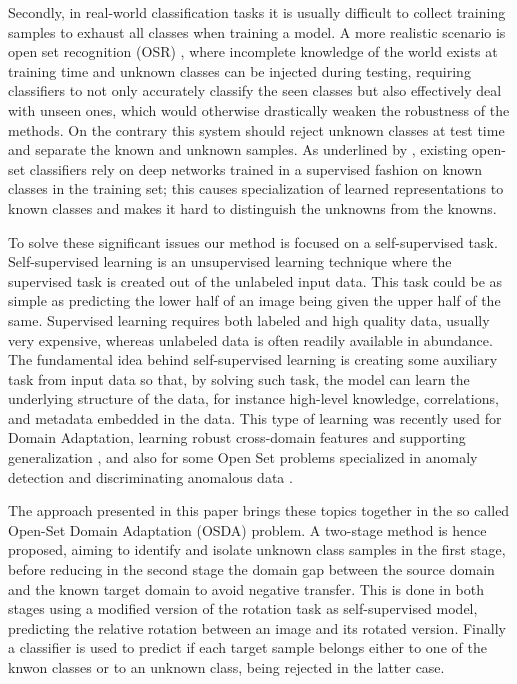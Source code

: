 \documentclass[10pt,twocolumn,letterpaper]{article}
\begin{document}
Secondly, 
in real-world classification tasks it is usually difficult to collect training samples to exhaust all classes when training a model.
A more realistic scenario is open set recognition (OSR) \cite{OSRsurvey},
where incomplete knowledge of the world exists at training time and unknown classes can be injected during testing, 
requiring classifiers to not only accurately classify the seen classes but also effectively deal with unseen ones,
which would otherwise drastically weaken the robustness of the methods.
On the contrary this system should reject unknown classes at test time and separate the known and unknown samples.
As underlined by \cite{OSRclassRec}, 
existing open-set classifiers rely on deep networks trained in a supervised fashion on known classes in the training set;
this causes specialization of learned representations to known classes and makes it hard to distinguish the unknowns from the knowns.

To solve these significant issues our method is focused on a self-supervised task. 
Self-supervised learning is an unsupervised learning technique where the supervised task is created out of the unlabeled input data. 
This task could be as simple as predicting the lower half of an image being given the upper half of the same.
Supervised learning requires both labeled and high quality data,
usually very expensive, 
whereas unlabeled data is often readily available in abundance.
The fundamental idea behind self-supervised learning is creating some auxiliary task from input data so that,
by solving such task,
the model can learn the underlying structure of the data,
for instance high-level knowledge, correlations, and metadata embedded in the data.
This type of learning was recently used for Domain Adaptation, 
learning robust cross-domain features and supporting generalization \cite{CarlucciJigsaw,SelfSupervisedXu},
and also for some Open Set problems specialized in anomaly detection and discriminating anomalous data \cite{bergman2020classificationbased,dectionGeometric}.

The approach presented in this paper brings these topics together in the so called Open-Set Domain Adaptation (OSDA) problem. 
A two-stage method is hence proposed, 
aiming to identify and isolate unknown class samples in the first stage, 
before reducing in the second stage the domain gap between the source domain and the known target domain to avoid negative transfer.
This is done in both stages using a modified version of the rotation task as self-supervised model,
predicting the relative rotation between an image and its rotated version.
Finally a classifier is used to predict if each target sample belongs either to one of the knwon classes or to an unknown class, 
being rejected in the latter case.
\end{document}
